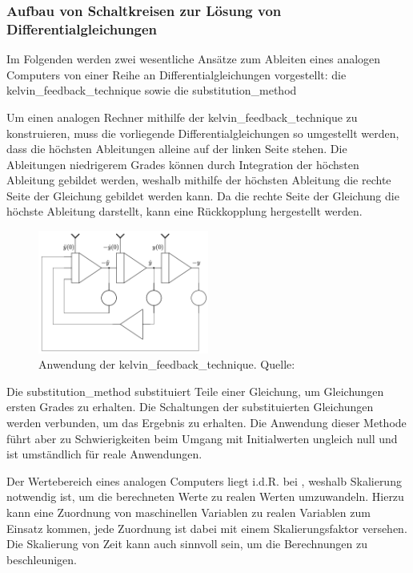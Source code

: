 \subsubsection{Aufbau von Schaltkreisen zur Lösung von Differentialgleichungen}

Im Folgenden werden zwei wesentliche Ansätze zum Ableiten eines analogen Computers von einer Reihe an Differentialgleichungen vorgestellt: die \gls{kelvin_feedback_technique} sowie die \gls{substitution_method}

Um einen analogen Rechner mithilfe der \gls{kelvin_feedback_technique} zu konstruieren, muss die vorliegende Differentialgleichungen so umgestellt werden, dass die höchsten Ableitungen alleine auf der linken Seite stehen. Die Ableitungen niedrigerem Grades können durch Integration der höchsten Ableitung gebildet werden, weshalb mithilfe der höchsten Ableitung die rechte Seite der Gleichung gebildet werden kann. Da die rechte Seite der Gleichung die höchste Ableitung darstellt, kann eine Rückkopplung hergestellt werden. \cite[vgl. S. 153 ff.]{Ulmann2022}

\begin{figure}[h]
  \includegraphics[width=0.5\textwidth]{abbildungen/kelvin_feedback_technik.png}
  \caption{Anwendung der \gls{kelvin_feedback_technique}. Quelle: \cite[S. 154]{Ulmann2022}}
  \label{fig:Kelvin Feedback Technik}
\end{figure}

Die \gls{substitution_method} substituiert Teile einer Gleichung, um Gleichungen ersten Grades zu erhalten. Die Schaltungen der substituierten Gleichungen werden verbunden, um das Ergebnis zu erhalten. Die Anwendung dieser Methode führt aber zu Schwierigkeiten beim Umgang mit Initialwerten ungleich null und ist umständlich für reale Anwendungen. \cite[vgl. S. 155 ff.]{Ulmann2022}

Der Wertebereich eines analogen Computers liegt i.d.R. bei , weshalb Skalierung notwendig ist, um die berechneten Werte zu realen Werten umzuwandeln. Hierzu kann eine Zuordnung von maschinellen Variablen zu realen Variablen zum Einsatz kommen, jede Zuordnung ist dabei mit einem Skalierungsfaktor versehen. Die Skalierung von Zeit kann auch sinnvoll sein, um die Berechnungen zu beschleunigen. \cite[vgl. S. 162 ff.]{Ulmann2022}

